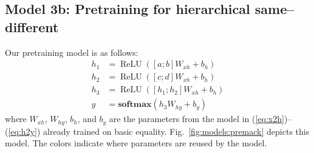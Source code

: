 \documentclass[12pt]{article}
\newcommand{\softmax}{\mathbf{softmax}}
\DeclareMathOperator{\ReLU}{ReLU}
\newcommand{\Figref}[1]{Fig.~\ref{#1}}
\newcommand{\eg}[1]{(\ref{#1})}
\newcommand{\dasheg}[2]{\eg{#1}--\eg{#2}}
\begin{document}

\subsection{Model 3b: Pretraining for hierarchical same--different}\label{sec:model3b}

Our pretraining model is as follows:
%
\begin{align}
  h_1 &= \ReLU([a;b]W_{xh} + b_{h}) \label{eq:preh1}\\
  h_2 &= \ReLU([c;d]W_{xh} + b_{h})\\
  h_3 &= \ReLU([h_1;h_2]W_{xh} + b_{h}) \\
  y &= \softmax(h_3W_{hy} + b_{y}) \label{eq:prey}\
\end{align}
%
where $W_{xh}$, $W_{hy}$, $b_h$, and $b_y$ are the parameters from the model in \dasheg{eq:x2h}{eq:h2y} already trained on basic equality. \Figref{fig:models:premack} depicts this model. The colors indicate where parameters are reused by the model.
\end{document}
